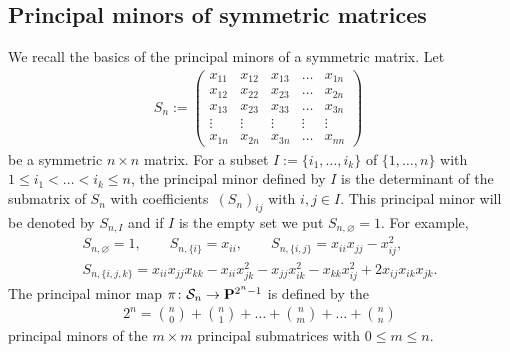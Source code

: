 \documentclass[pdftex]{sigma}
\newcommand{\PP}{{\bf P}}
\newcommand{\cS}{{\cal S}}
\numberwithin{equation}{section}
\begin{document}
\subsection{Principal minors of symmetric matrices} \label{pm}
We recall the basics of the principal minors of a symmetric matrix. Let
\begin{gather*}
S_n := \left(\begin{matrix} x_{11}&x_{12}&x_{13}&\ldots&x_{1n}\\
x_{12}&x_{22}&x_{23}&\ldots&x_{2n}\\
x_{13}&x_{23}&x_{33}&\ldots&x_{3n}\\
\vdots&\vdots&\vdots&\vdots&\vdots\\
x_{1n}&x_{2n}&x_{3n}&\ldots&x_{nn}
\end{matrix}\right)~
\end{gather*}
be a symmetric $n\times n$ matrix. For a subset $I:=\{i_1,\ldots,i_k\}$ of $\{1,\ldots,n\}$ with $1\leq i_1<\dots<i_k\allowbreak \leq n$, the principal minor defined by $I$ is the determinant of the submatrix of $S_n$ with coefficients~$(S_n)_{ij}$ with $i,j\in I$. This principal minor will be denoted by $S_{n,I}$ and if $I$ is the empty set we put $S_{n,\varnothing}=1$. For example,
\begin{gather*}
S_{n,\varnothing}=1,\qquad
S_{n,\{i\}}=x_{ii},\qquad
S_{n,\{i,j\}}=x_{ii}x_{jj} - x_{ij}^2,\\
S_{n,\{i,j,k\}}=x_{ii}x_{jj}x_{kk}-x_{ii}x_{jk}^2 - x_{jj}x_{ik}^2 - x_{kk}x_{ij}^2 + 2x_{ij}x_{ik}x_{jk}.
\end{gather*}
The principal minor map $\pi\colon \cS_n\rightarrow \PP^{2^{n}-1}$ is defined by the
\begin{gather*}
2^{n} = \binom{n}{0} + \binom{n}{1} + \dots +\binom{n}{m} + \dots + \binom{n}{n}
\end{gather*}
principal minors of the $m\times m$ principal submatrices with $0\leq m\leq n$.
\end{document}
